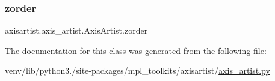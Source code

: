 \subsubsection{\texorpdfstring{zorder}{zorder}}
{\footnotesize\ttfamily axisartist.\+axis\+\_\+artist.\+Axis\+Artist.\+zorder\hspace{0.3cm}{\ttfamily [static]}}



The documentation for this class was generated from the following file\+:\begin{DoxyCompactItemize}
\item 
venv/lib/python3./site-\/packages/mpl\+\_\+toolkits/axisartist/\hyperlink{axisartist_2axis__artist_8py}{axis\+\_\+artist.\+py}\end{DoxyCompactItemize}
